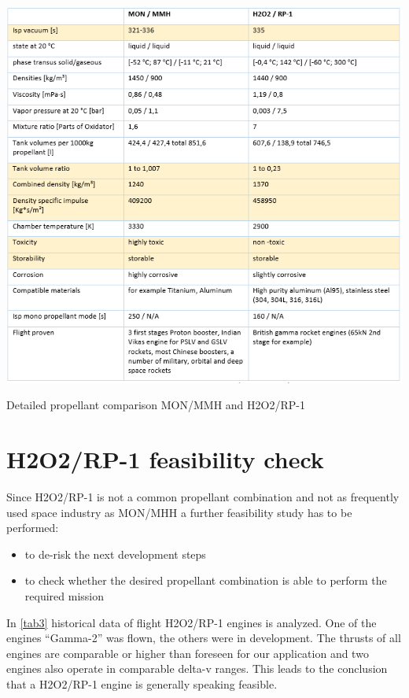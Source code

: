 \begin{table}
	\centering\includegraphics[width=\linewidth]{detailedcompprop}
	\caption{Detailed propellant comparison MON/MMH and H2O2/RP-1}\label{tab2}
\end{table}
\section{H2O2/RP-1 feasibility check}
\qquad Since H2O2/RP-1 is not a common propellant combination and not as frequently used space industry as MON/MHH a further feasibility study has to be performed:

\begin{itemize}
	\item	to de-risk the next development steps
	\item	to check whether the desired propellant combination is able to perform the required mission
\end{itemize}

In \ref{tab3} historical data of flight H2O2/RP-1 engines is analyzed. One of the engines “Gamma-2” was flown, the others were in development. The thrusts of all engines are comparable or higher than foreseen for our application and two engines also operate in comparable delta-v ranges. This leads to the conclusion that a H2O2/RP-1 engine is generally speaking feasible.

